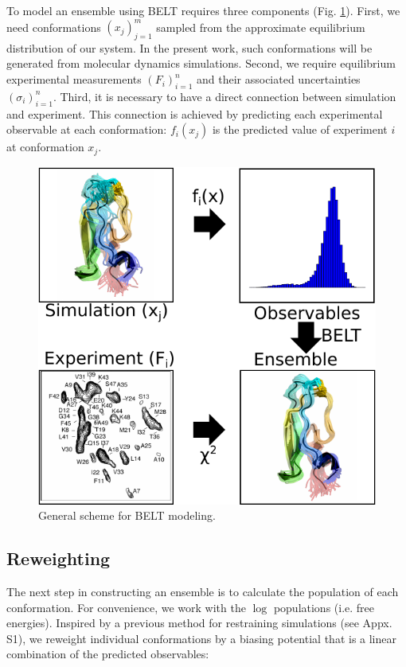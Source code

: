 \documentclass[11pt,titlepage]{article}
\begin{document}
To model an ensemble using BELT requires three components (Fig. \ref{figure:BELT}).  First, we need conformations $(x_j)_{j=1}^{m}$ sampled from the approximate equilibrium distribution of our system.  In the present work, such conformations will be generated from molecular dynamics simulations.  Second, we require equilibrium experimental measurements $(F_i)_{i=1}^n$ and their associated uncertainties $(\sigma_i)_{i=1}^{n}$.  Third, it is necessary to have a direct connection between simulation and experiment.  This connection is achieved by predicting each experimental observable at each conformation: $f_i(x_j)$ is the predicted value of experiment $i$ at conformation $x_j$.  

\begin{figure}

\includegraphics[width=16.0cm]{figures/info_graphic/info_graphic.pdf}

\caption{
General scheme for BELT modeling.
}
\label{figure:BELT}
\end{figure}

\subsection*{Reweighting}

The next step in constructing an ensemble is to calculate the population of each conformation.  For convenience, we work with the $\log$ populations (i.e. free energies). Inspired by a previous method for restraining simulations  \citep{chodera2012} (see Appx. S1), we reweight individual conformations by a biasing potential that is a linear combination of the predicted observables:
\end{document}
